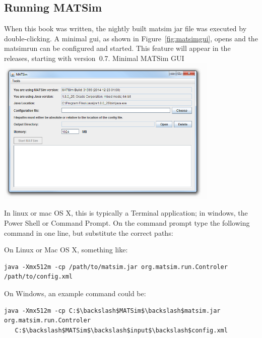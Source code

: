\subsection{Running MATSim}
\label{sec:runexample}
When this book was written, the nightly built \gls{matsim} \gls{jar} file was executed by double-clicking. A minimal \gls{gui}, as shown in Figure~\ref{fig:matsimgui}, opens and the \gls{matsimrun} can be configured and started. 
This feature will appear in the releases, starting with version~0.7.
%
%
{Minimal MATSim GUI}%
{\label{fig:matsimgui}}%
{\includegraphics[width=0.8\textwidth, angle=0]{using/figures/matsimgui.png}}%
{}

%
In \gls{linux} or \gls{mac} OS X, this is typically a Terminal application; in \gls{windows}, the Power Shell or Command Prompt.
%
On the command prompt type the following command in one line, but substitute the correct paths: 

On Linux or Mac OS X, something like:
\begin{lstlisting}
java -Xmx512m -cp /path/to/matsim.jar org.matsim.run.Controler /path/to/config.xml
\end{lstlisting}


On Windows, an example command could be: 
\begin{lstlisting}
java -Xmx512m -cp C:$\backslash$MATSim$\backslash$matsim.jar org.matsim.run.Controler
   C:$\backslash$MATSim$\backslash$input$\backslash$config.xml
\end{lstlisting}

